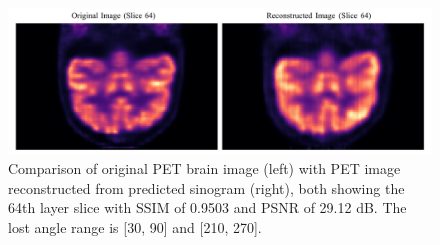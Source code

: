\documentclass[12pt]{iopart}
\begin{document}
\begin{figure}[ht]
    \centering
    \includegraphics[width=\textwidth]{Images/compare_reconstruction_restoration2}
    \vspace{-1cm}
    \caption{Comparison of original PET brain image (left) with PET image reconstructed from predicted sinogram (right), both showing the 64th layer slice with SSIM of 0.9503 and PSNR of 29.12 dB. The lost angle range is [30\degree, 90\degree] and [210\degree, 270\degree]. 
    }
    \label{fig:pet_brain_reconstruction}
\end{figure}

\end{document}
